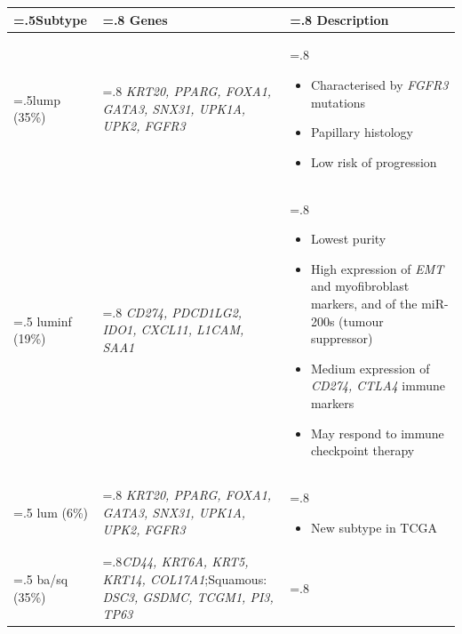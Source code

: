 \begin{table}[H]
    \centering
    \small
    \begin{tabularx}{\textwidth}{ >{\hsize=.5\hsize}X |>{\hsize=.8\hsize}X |>{\hsize=.8\hsize}X
    }
    \toprule
    Subtype & Genes & Description \\
    \midrule
    \acrlong{lump} (35\%) & \textit{KRT20, PPARG, FOXA1, GATA3, SNX31, UPK1A, UPK2, FGFR3} & 
    \begin{itemize}[leftmargin=*, nosep, after=\vspace{-\baselineskip}, before=\vspace{-.6\baselineskip}]
        \item Characterised by \textit{FGFR3} mutations
        \item Papillary histology
        \item Low risk of progression
    \end{itemize} \\
    \midrule
    \acrlong{luminf} (19\%) & \textit{CD274, PDCD1LG2, IDO1, CXCL11, L1CAM, SAA1} & 
    \begin{itemize}[leftmargin=*, nosep, after=\vspace{-\baselineskip}, before=\vspace{-.6\baselineskip}]
        \item Lowest purity
        \item High expression of \textit{EMT} and myofibroblast markers, and of the miR-200s (tumour suppressor)
        \item Medium expression of \textit{CD274, CTLA4} immune markers
        \item May respond to immune checkpoint therapy
    \end{itemize} \\
    \midrule
    \acrlong{lum}  (6\%) & \textit{KRT20, PPARG, FOXA1, GATA3, SNX31, UPK1A, UPK2, FGFR3} & 
    \begin{itemize}[leftmargin=*, nosep, after=\vspace{-\baselineskip}, before=\vspace{-.6\baselineskip}]
        \item New subtype in TCGA
    \end{itemize} \\
    \midrule
    \acrlong{ba/sq}  (35\%) &\textit{CD44, KRT6A, KRT5, KRT14, COL17A1};Squamous: \textit{DSC3, GSDMC, TCGM1, PI3, TP63} & 
    \begin{itemize}[leftmargin=*, nosep, after=\vspace{-\baselineskip}, before=\vspace{-.6\baselineskip}]

\end{itemize}
\end{tabularx}
\end{table}
